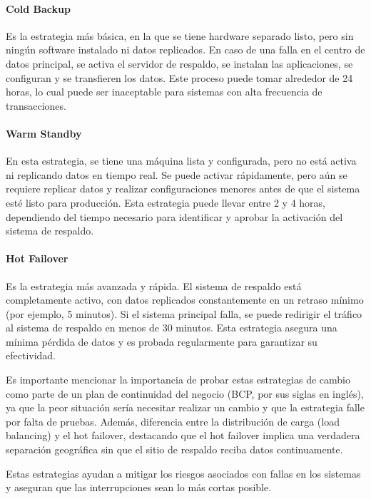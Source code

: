 \paragraph{Cold Backup} Es la estrategia más básica, en la que se tiene hardware separado listo, pero sin ningún software instalado ni datos replicados. En caso de una falla en el centro de datos principal, se activa el servidor de respaldo, se instalan las aplicaciones, se configuran y se transfieren los datos. Este proceso puede tomar alrededor de 24 horas, lo cual puede ser inaceptable para sistemas con alta frecuencia de transacciones.

\paragraph{Warm Standby} En esta estrategia, se tiene una máquina lista y configurada, pero no está activa ni replicando datos en tiempo real. Se puede activar rápidamente, pero aún se requiere replicar datos y realizar configuraciones menores antes de que el sistema esté listo para producción. Esta estrategia puede llevar entre 2 y 4 horas, dependiendo del tiempo necesario para identificar y aprobar la activación del sistema de respaldo.

\paragraph{Hot Failover} Es la estrategia más avanzada y rápida. El sistema de respaldo está completamente activo, con datos replicados constantemente en un retraso mínimo (por ejemplo, 5 minutos). Si el sistema principal falla, se puede redirigir el tráfico al sistema de respaldo en menos de 30 minutos. Esta estrategia asegura una mínima pérdida de datos y es probada regularmente para garantizar su efectividad.

Es importante mencionar la importancia de probar estas estrategias de cambio como parte de un plan de continuidad del negocio (BCP, por sus siglas en inglés), ya que la peor situación sería necesitar realizar un cambio y que la estrategia falle por falta de pruebas. Además, diferencia entre la distribución de carga (load balancing) y el hot failover, destacando que el hot failover implica una verdadera separación geográfica sin que el sitio de respaldo reciba datos continuamente.

Estas estrategias ayudan a mitigar los riesgos asociados con fallas en los sistemas y aseguran que las interrupciones sean lo más cortas posible.

